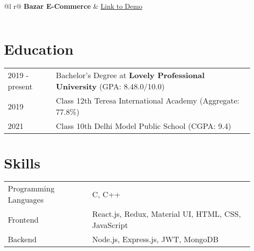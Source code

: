 \documentclass[a4paper,12pt]{article}
\begin{document}
\begin{tabularx}{\linewidth}{ @{}l r@{} }
\textbf{Bazar E-Commerce} & \hfill \href{https://bazar-app-front-end.vercel.app}{Link to Demo} \\[3.75pt]
  \\
\end{tabularx}

\section{Education}
\begin{tabularx}{\linewidth}{@{}l X@{}}	

2019 - present & Bachelor's Degree at \textbf{Lovely Professional University} \hfill (GPA: 8.48.0/10.0) \\ 

2019 & Class 12th Teresa International Academy \hfill  (Aggregate: 77.8\%) \\

2021 & Class 10th Delhi Model Public School \hfill  (CGPA: 9.4) \\
\end{tabularx}


\section{Skills}
\begin{tabularx}{\linewidth}{@{}l X@{}}
Programming Languages  &  \normalsize{C, C++}\\ 
Frontend &  \normalsize{React.js, Redux, Material UI, HTML, CSS, JavaScript}\\
Backend  &  \normalsize{Node.js, Express.js, JWT, MongoDB}\\ 
\end{tabularx}

\end{document}
